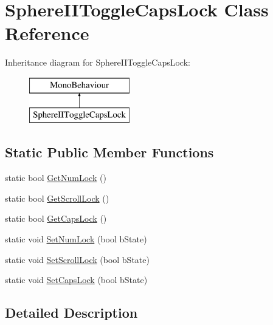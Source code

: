 \hypertarget{class_sphere_i_i_toggle_caps_lock}{}\section{Sphere\+I\+I\+Toggle\+Caps\+Lock Class Reference}
\label{class_sphere_i_i_toggle_caps_lock}
Inheritance diagram for Sphere\+I\+I\+Toggle\+Caps\+Lock\+:\begin{figure}[H]
\begin{center}
\leavevmode
\includegraphics[height=2.000000cm]{d3/d04/class_sphere_i_i_toggle_caps_lock}
\end{center}
\end{figure}
\subsection*{Static Public Member Functions}
\begin{DoxyCompactItemize}
\item 
static bool \mbox{\hyperlink{class_sphere_i_i_toggle_caps_lock_a1b6978f053626621672a251e6c40c3a2}{Get\+Num\+Lock}} ()
\item 
static bool \mbox{\hyperlink{class_sphere_i_i_toggle_caps_lock_a0eff2dfb670c381cfe929800250b8ed0}{Get\+Scroll\+Lock}} ()
\item 
static bool \mbox{\hyperlink{class_sphere_i_i_toggle_caps_lock_a684bc925850f81d58ef9d4c7500a0a86}{Get\+Caps\+Lock}} ()
\item 
static void \mbox{\hyperlink{class_sphere_i_i_toggle_caps_lock_a2cf9b477dbc8503b11958438fa9cc69d}{Set\+Num\+Lock}} (bool b\+State)
\item 
static void \mbox{\hyperlink{class_sphere_i_i_toggle_caps_lock_a9bcfc13eeb39d6b83d6d9215dccf620e}{Set\+Scroll\+Lock}} (bool b\+State)
\item 
static void \mbox{\hyperlink{class_sphere_i_i_toggle_caps_lock_a2a6a8e77a1901b4a6358dee035f67b9a}{Set\+Caps\+Lock}} (bool b\+State)
\end{DoxyCompactItemize}


\subsection{Detailed Description}


